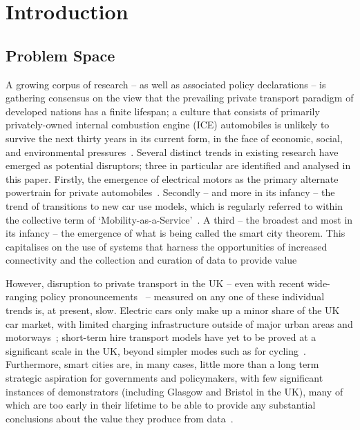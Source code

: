 \documentclass[b5paper,10pt]{article}
\begin{document}
\section{Introduction}\label{intro}

\subsection{Problem Space}

A growing corpus of research -- as well as associated policy
declarations -- is gathering consensus on
the view that the prevailing private transport paradigm of developed
nations has a finite lifespan; a culture that consists of primarily
privately-owned internal combustion engine (ICE) automobiles is
unlikely to survive the next thirty years in its current form, in the
face of economic, social, and environmental
pressures~\citep{lerner:2011,van-audenhove-et-al:2014,black-et-al:2016}.
Several distinct trends in existing research have emerged as potential
disruptors; three in particular are identified and analysed in this
paper. Firstly, the emergence of electrical motors as the primary
alternate powertrain for private
automobiles~\citep{paffumi-et-al:2015,gnann-et-al:2015}.  Secondly --
and more in its infancy -- the trend of transitions to new car use
models, which is regularly referred to within the collective term of
`Mobility-as-a-Service'~\citep{tscatapult:2016}. A third -- the
broadest and most in its infancy -- the emergence of what is being
called the smart city theorem. This capitalises on the use of systems
that harness the opportunities of increased connectivity and the
collection and curation of data to provide
value~\citep{townsend:2013,cosgrave-et-al:2013,ibm:2014}

However, disruption to private transport in the UK -- even with recent
wide-ranging policy pronouncements~\citep{bbcnews:2017} -- measured on
any one of these individual trends is, at present, slow. Electric cars
only make up a minor share of the UK car market, with limited charging
infrastructure outside of major urban areas and
motorways~\citep{dft:2008}; short-term hire transport models have yet
to be proved at a significant scale in the UK, beyond simpler modes
such as for cycling~\citep{kamargianni-et-al:2016}. Furthermore, smart
cities are, in many cases, little more than a long term strategic
aspiration for governments and policymakers, with few significant
instances of demonstrators (including Glasgow and Bristol in the UK),
many of which are too early in their lifetime to be able to provide
any substantial conclusions about the value they produce from
data~\citep{caragliu-et-al:2011}.
\end{document}
